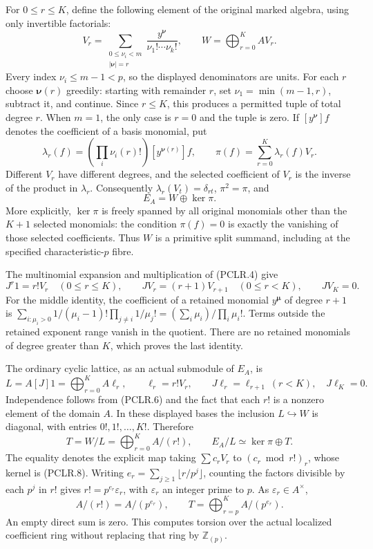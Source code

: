 For \(0\leq r\leq K\), define the following element of the original
marked algebra, using only invertible factorials:
\[
 V_r=\sum_{\substack{0\leq\nu_i<m\\|\boldsymbol\nu|=r}}
          \frac{y^{\boldsymbol\nu}}{\nu_1!\cdots\nu_k!},
 \qquad W=\bigoplus_{r=0}^K A V_r.
 \tag{PCLR.4}
\]
Every index \(\nu_i\leq m-1<p\), so the displayed denominators are
units. For each \(r\) choose \(\boldsymbol\nu(r)\) greedily: starting
with remainder \(r\), set \(\nu_1=\min(m-1,r)\), subtract it, and
continue. Since \(r\leq K\), this produces a permitted tuple of
total degree \(r\). When \(m=1\), the only case is \(r=0\) and the
tuple is zero. If \([y^{\boldsymbol\nu}]f\) denotes the coefficient
of a basis monomial, put
\[
 \lambda_r(f)=\left(\prod_i\nu_i(r)!\right)
                    [y^{\boldsymbol\nu(r)}]f,\qquad
 \pi(f)=\sum_{r=0}^K\lambda_r(f)V_r.
 \tag{PCLR.5}
\]
Different \(V_r\) have different degrees, and the selected
coefficient of \(V_r\) is the inverse of the product in
\(\lambda_r\). Consequently \(\lambda_r(V_t)=\delta_{rt}\),
\(\pi^2=\pi\), and
\[
 E_A=W\oplus\ker\pi.
 \tag{PCLR.6}
\]
More explicitly, \(\ker\pi\) is freely spanned by all original
monomials other than the \(K+1\) selected monomials: the condition
\(\pi(f)=0\) is exactly the vanishing of those selected
coefficients. Thus \(W\) is a primitive split summand, including
at the specified characteristic-\(p\) fibre.

The multinomial expansion and multiplication of (PCLR.4) give
\[
 J^r1=r!V_r\quad(0\leq r\leq K),\qquad
 JV_r=(r+1)V_{r+1}\quad(0\leq r<K),\qquad JV_K=0.
 \tag{PCLR.7}
\]
For the middle identity, the coefficient of a retained monomial
\(y^{\boldsymbol\mu}\) of degree \(r+1\) is
\(\sum_{i:\mu_i>0}1/(\mu_i-1)!\prod_{j\ne i}1/\mu_j!
=(\sum_i\mu_i)/\prod_i\mu_i!\).
Terms outside the retained exponent range vanish in the quotient.
There are no retained monomials of degree greater than \(K\),
which proves the last identity.

The ordinary cyclic lattice, as an actual submodule of \(E_A\), is
\[
 L=A[J]1=\bigoplus_{r=0}^K A\ell_r,\qquad
 \ell_r=r!V_r,\qquad
 J\ell_r=\ell_{r+1}\ (r<K),\quad J\ell_K=0.
 \tag{PCLR.8}
\]
Independence follows from (PCLR.6) and the fact that each \(r!\)
is a nonzero element of the domain \(A\). In these displayed bases
the inclusion \(L\hookrightarrow W\) is diagonal, with entries
\(0!,1!,\ldots,K!\). Therefore
\[
 T=W/L=\bigoplus_{r=0}^K A/(r!),\qquad
 E_A/L\simeq\ker\pi\oplus T.
 \tag{PCLR.9}
\]
The equality denotes the explicit map taking
\(\sum c_rV_r\) to \((c_r\bmod r!)_r\), whose kernel is (PCLR.8).
Writing \(e_r=\sum_{j\geq1}\lfloor r/p^j\rfloor\), counting the
factors divisible by each \(p^j\) in \(r!\) gives
\(r!=p^{e_r}\varepsilon_r\), with \(\varepsilon_r\) an integer
prime to \(p\). As \(\varepsilon_r\in A^\times\),
\[
 A/(r!)=A/(p^{e_r}),\qquad
 T=\bigoplus_{r=p}^K A/(p^{e_r}).
 \tag{PCLR.10}
\]
An empty direct sum is zero. This computes torsion over the actual
localized coefficient ring without replacing that ring by
\(\mathbb Z_{(p)}\).

